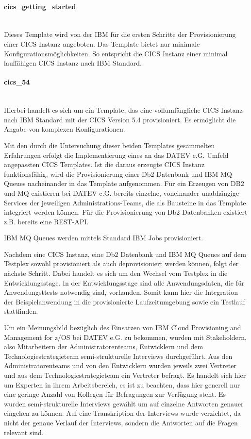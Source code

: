 \paragraph{\glqq cics\_getting\_started\grqq}~\\
Dieses Template wird von der IBM für die ersten Schritte der Provisionierung einer CICS Instanz angeboten.
Das Template bietet nur minimale Konfigurationsmöglichkeiten.
So entspricht die CICS Instanz einer minimal lauffähigen CICS Instanz nach IBM Standard.

\paragraph{\glqq cics\_54\grqq}~\\
Hierbei handelt es sich um ein Template, das eine vollumfängliche CICS Instanz nach IBM Standard mit der CICS Version 5.4 provisioniert.
Es ermöglicht die Angabe von komplexen Konfigurationen.

Mit den durch die Untersuchung dieser beiden Templates gesammelten Erfahrungen erfolgt die Implementierung eines an das DATEV e.G. Umfeld angepassten CICS Templates.
Ist die daraus erzeugte CICS Instanz funktionsfähig, wird die Provisionierung einer Db2 Datenbank und IBM MQ Queues nacheinander in das Template aufgenommen. 
Für ein Erzeugen von DB2 und MQ existieren bei DATEV e.G. bereits einzelne, voneinander unabhängige Services der jeweiligen Administrations-Teams, die als Bausteine in das Template integriert werden können.
Für die Provisionierung von Db2 Datenbanken existiert z.B. bereits eine REST-API.

IBM MQ Queues werden mittels Standard IBM Jobs provisioniert.


Nachdem eine CICS Instanz, eine Db2 Datenbank und IBM MQ Queues auf dem Testplex sowohl provisioniert als auch deprovisioniert werden können, folgt der nächste Schritt.
Dabei handelt es sich um den Wechsel vom Testplex in die Entwicklungsstage.
In der Entwicklungsstage sind alle Anwendungsdaten, die für Anwendungsttests notwendig sind, vorhanden.
Somit kann hier die Integration der Beispielanwendung in die provisionierte Laufzeitumgebung sowie ein Testlauf stattfinden.

Um ein Meinungsbild bezüglich des Einsatzen von \glqq IBM Cloud Provisioning and Management for z/OS\grqq{} bei DATEV e.G. zu bekommen, wurden mit Stakeholdern, also Mitarbeitern der Administratorenteams, Entwicklern und dem Technologiestrategieteam semi-strukturelle Interviews durchgeführt.
Aus den Administratorenteams und von den Entwicklern wurden jeweils zwei Vertreter und aus dem Technologiestrategieteam ein Vertreter befragt.
Es handelt sich hier um Experten in ihrem Arbeitsbereich, es ist zu beachten, dass hier generell nur eine geringe Anzahl von Kollegen für Befragungen zur Verfügung steht.
Es wurden semi-strukturelle Interviews gewählt um auf einzelne Antworten genauer eingehen zu können.
Auf eine Transkription der Interviews wurde verzichtet, da nicht der genaue Verlauf der Interviews, sondern die Antworten auf die Fragen relevant sind.

